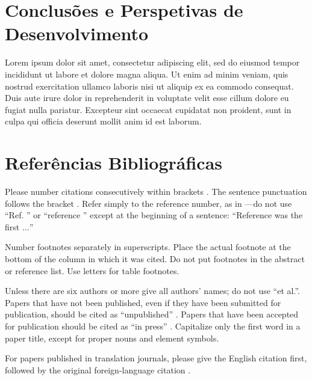 \documentclass[conference]{IEEEtran}
\begin{document}
\section{Conclusões e Perspetivas de Desenvolvimento}
Lorem ipsum dolor sit amet, consectetur adipiscing elit, sed do eiusmod tempor incididunt ut labore et dolore magna aliqua. Ut enim ad minim veniam, quis nostrud exercitation ullamco laboris nisi ut aliquip ex ea commodo consequat. Duis aute irure dolor in reprehenderit in voluptate velit esse cillum dolore eu fugiat nulla pariatur. Excepteur sint occaecat cupidatat non proident, sunt in culpa qui officia deserunt mollit anim id est laborum.






\section*{Referências Bibliográficas}


Please number citations consecutively within brackets \cite{b1}. The 
sentence punctuation follows the bracket \cite{b2}. Refer simply to the reference 
number, as in \cite{b3}---do not use ``Ref. \cite{b3}'' or ``reference \cite{b3}'' except at 
the beginning of a sentence: ``Reference \cite{b3} was the first $\ldots$''

Number footnotes separately in superscripts. Place the actual footnote at 
the bottom of the column in which it was cited. Do not put footnotes in the 
abstract or reference list. Use letters for table footnotes.

Unless there are six authors or more give all authors' names; do not use 
``et al.''. Papers that have not been published, even if they have been 
submitted for publication, should be cited as ``unpublished'' \cite{b4}. Papers 
that have been accepted for publication should be cited as ``in press'' \cite{b5}. 
Capitalize only the first word in a paper title, except for proper nouns and 
element symbols.

For papers published in translation journals, please give the English 
citation first, followed by the original foreign-language citation \cite{b6}.
\end{document}
